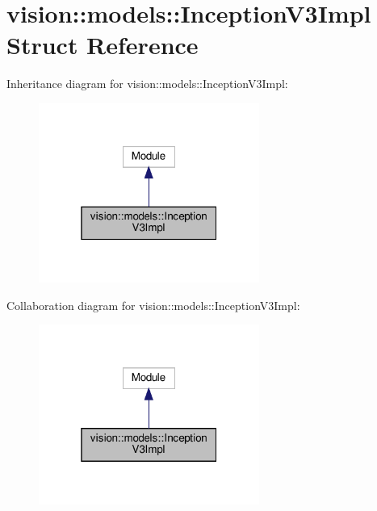 \hypertarget{structvision_1_1models_1_1InceptionV3Impl}{}\section{vision\+:\+:models\+:\+:Inception\+V3\+Impl Struct Reference}
\label{structvision_1_1models_1_1InceptionV3Impl}


Inheritance diagram for vision\+:\+:models\+:\+:Inception\+V3\+Impl\+:
\nopagebreak
\begin{figure}[H]
\begin{center}
\leavevmode
\includegraphics[width=205pt]{structvision_1_1models_1_1InceptionV3Impl__inherit__graph}
\end{center}
\end{figure}


Collaboration diagram for vision\+:\+:models\+:\+:Inception\+V3\+Impl\+:
\nopagebreak
\begin{figure}[H]
\begin{center}
\leavevmode
\includegraphics[width=205pt]{structvision_1_1models_1_1InceptionV3Impl__coll__graph}
\end{center}
\end{figure}
